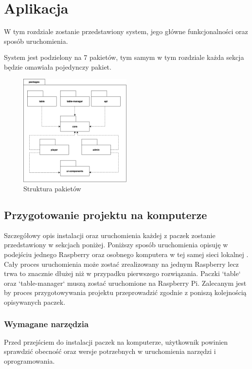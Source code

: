 \chapter{Aplikacja}
\label{ch:funplenop}
W tym rozdziale zostanie przedstawiony system, jego główne funkcjonalności oraz sposób uruchomienia.

System jest podzielony na 7 pakietów, tym samym w tym rozdziale każda sekcja będzie omawiała pojedynczy pakiet.

\begin{figure}[h!]
  \centering
    \includegraphics[width=0.5\textwidth]{images/diagrams/packages_structure.png}
  \caption{Struktura pakietów}
  \label{fig:mobile}
\end{figure}


\section{Przygotowanie projektu na komputerze}

Szczegółowy opis instalacji oraz uruchomienia każdej z paczek zostanie przedstawiony w sekcjach poniżej.
Poniższy sposób uruchomienia opisuję w podejściu jednego Raspberry oraz osobnego komputera w tej samej sieci lokalnej . Cały proces uruchomienia może zostać zrealizowany na jednym Raspberry lecz trwa to znacznie dłużej niż w przypadku pierwszego rozwiązania. Paczki `table` oraz `table-manager` muszą zostać uruchomione na Raspberry Pi. Zalecanym jest by proces przygotowywania projektu przeprowadzić zgodnie z poniszą kolejnością opisywanych paczek.

\subsection{Wymagane narzędzia}
Przed przejściem do instalacji paczek na komputerze, użytkownik powinien sprawdzić obecność oraz wersje potrzebnych w uruchomienia narzędzi i oprogramowania.

